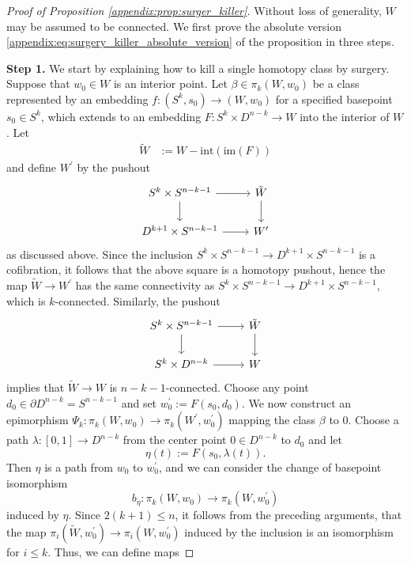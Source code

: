 \begin{proof}[Proof of Proposition \ref{appendix:prop:surger_killer}]
    Without loss of generality, $W$ may be assumed to be connected. We first prove the absolute version \ref{appendix:eq:surgery_killer_absolute_version} of the proposition in three steps.

    \noindent \textbf{Step 1.} We start by explaining how to kill a single homotopy class by surgery. Suppose that $w_0 \in W$ is an interior point. Let $\beta \in \pi_k(W,w_0)$ be a class represented by an embedding $f \colon (S^k,s_0) \to (W,w_0)$ for a specified basepoint $s_0 \in S^k$, which extends to an embedding $F \colon S^k \times D^{n-k} \to W$ into the interior of $W$. Let 
    \begin{align*}
        \tilde{W} &:= W - \mathrm{int}(\mathrm{im}(F))
    \end{align*}
    and define $W^\prime$ by the pushout
    \[\begin{tikzcd}
	{S^k \times S^{n-k-1}} & {\tilde{W}} \\
	{D^{k+1} \times S^{n-k-1}} & {W^\prime}
	\arrow[from=1-1, to=1-2]
	\arrow[from=1-1, to=2-1]
	\arrow[from=1-2, to=2-2]
	\arrow[from=2-1, to=2-2]
    \end{tikzcd}\]
    as discussed above. Since the inclusion $S^k \times S^{n-k-1} \to D^{k+1} \times S^{n-k-1}$ is a cofibration, it follows that the above square is a homotopy pushout, hence the map $\tilde{W} \to W^\prime$ has the same connectivity as $S^k \times S^{n-k-1} \to D^{k+1} \times S^{n-k-1}$, which is $k$-connected. Similarly, the pushout 
    \[\begin{tikzcd}
	{S^k \times S^{n-k-1}} & {\tilde{W}} \\
	{S^k \times D^{n-k}} & W
	\arrow[from=1-1, to=1-2]
	\arrow[from=1-1, to=2-1]
	\arrow[from=1-2, to=2-2]
	\arrow[from=2-1, to=2-2]
    \end{tikzcd}\]
    implies that $\tilde{W} \to W$ is $n-k-1$-connected. Choose any point $d_0 \in \partial D^{n-k} = S^{n-k-1}$ and set $w_0^\prime := F(s_0,d_0)$. We now construct an epimorphism $\Psi_k \colon \pi_k(W,w_0) \to \pi_k(W^\prime,w_0^\prime)$ mapping the class $\beta$ to $0$. Choose a path $\lambda \colon [0,1] \to D^{n-k}$ from the center point $0 \in D^{n-k}$ to $d_0$ and let
    \[
    \eta(t) := F(s_0,\lambda(t)).
    \]
    Then $\eta$ is a path from $w_0$ to $w_0^\prime$, and we can consider the change of basepoint isomorphism
    \[
    b_\eta \colon \pi_k(W,w_0) \to \pi_k(W,w_0^\prime)
    \]
    induced by $\eta$. Since $2(k+1) \leq n$, it follows from the preceding arguments, that the map $\pi_i(\tilde{W},w_0^\prime) \to \pi_i(W,w_0^\prime)$ induced by the inclusion is an isomorphism for $i \leq k$. Thus, we can define maps

\end{proof}
